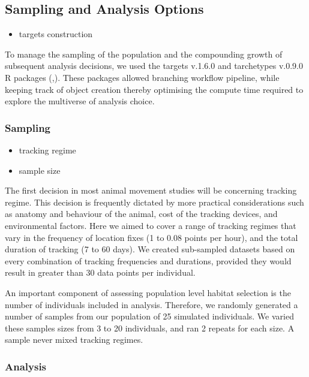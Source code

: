 \documentclass[10pt,a4paper]{article}
\providecommand{\tightlist}{%
  \setlength{\itemsep}{0pt}\setlength{\parskip}{0pt}}
\begin{document}
\subsection{Sampling and Analysis Options}\label{sampling-and-analysis-options}

\begin{itemize}
\tightlist
\item
  targets construction
\end{itemize}

To manage the sampling of the population and the compounding growth of subsequent analysis decisions, we used the targets v.1.6.0 and tarchetypes v.0.9.0 R packages (,).
These packages allowed branching workflow pipeline, while keeping track of object creation thereby optimising the compute time required to explore the multiverse of analysis choice.

\subsubsection{Sampling}\label{sampling}

\begin{itemize}
\item
  tracking regime
\item
  sample size
\end{itemize}

The first decision in most animal movement studies will be concerning tracking regime.
This decision is frequently dictated by more practical considerations such as anatomy and behaviour of the animal, cost of the tracking devices, and environmental factors.
Here we aimed to cover a range of tracking regimes that vary in the frequency of location fixes (1 to 0.08 points per hour), and the total duration of tracking (7 to 60 days).
We created sub-sampled datasets based on every combination of tracking frequencies and durations, provided they would result in greater than 30 data points per individual.

An important component of assessing population level habitat selection is the number of individuals included in analysis.
Therefore, we randomly generated a number of samples from our population of 25 simulated individuals.
We varied these samples sizes from 3 to 20 individuals, and ran 2 repeats for each size.
A sample never mixed tracking regimes.

\subsubsection{Analysis}\label{analysis}
\end{document}
